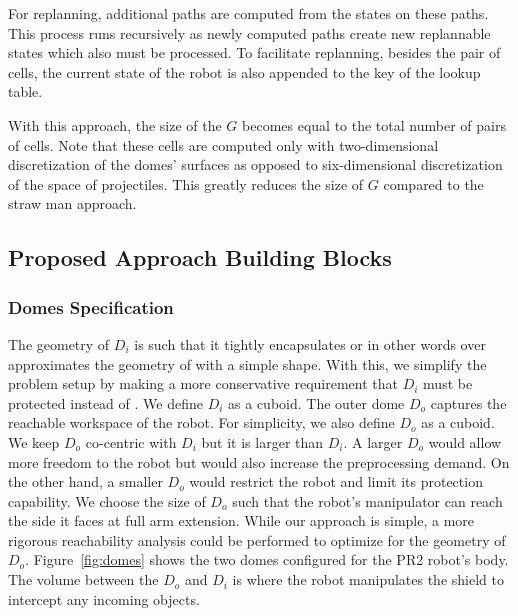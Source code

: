 \documentclass[a4paper]{report}
\begin{document}
For replanning, additional paths are computed from the states on these paths. This process runs recursively as newly computed paths create new replannable states which also must be processed. To facilitate replanning, besides the pair of cells, the current state \Sstart of the robot is also appended to the key of the lookup table.

With this approach, the size of the $G$ becomes equal to the total number of pairs of cells. Note that these cells are computed only with two-dimensional discretization of the domes' surfaces as opposed to six-dimensional discretization of the space of projectiles. This greatly reduces the size of $G$ compared to the straw man approach.

\subsection{Proposed Approach Building Blocks}
\subsubsection{Domes Specification}
The geometry of $D_i$ is such that it tightly encapsulates \calB or in other words over approximates the geometry of \calB with a simple shape. With this, we simplify the problem setup by making a more conservative requirement that $D_i$ must be protected instead of \calB. We define $D_i$ as a cuboid.
The outer dome $D_o$ captures the reachable workspace of the robot. For simplicity, we also define $D_o$ as a cuboid.
We keep $D_o$ co-centric with $D_i$ but it is larger than $D_i$. A larger $D_o$ would allow more freedom to the robot but would also increase the preprocessing demand. On the other hand, a smaller $D_o$ would restrict the robot and limit its protection capability.
We choose the size of $D_o$ such that the robot's manipulator can reach the side it faces at full arm extension. While our approach is simple, a more rigorous reachability analysis could be performed to optimize for the geometry of $D_o$.
Figure~\ref{fig:domes} shows the two domes configured for the PR2 robot's body. The volume between the $D_o$ and $D_i$ is where the robot manipulates the shield to intercept any incoming objects. 
\end{document}
